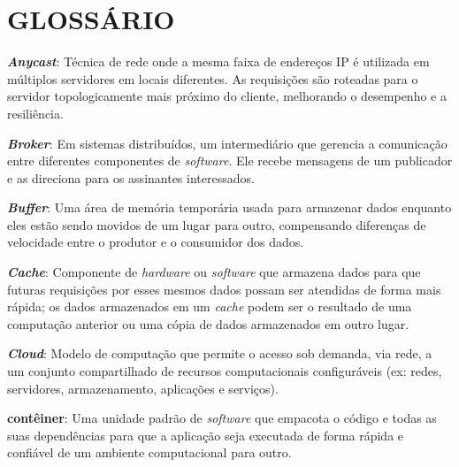 






\chapter*{GLOSSÁRIO}

{ \setlength{\parindent}{0pt} %

\textbf{\textit{Anycast}}: Técnica de rede onde a mesma faixa de endereços IP é utilizada em múltiplos servidores em locais diferentes. As requisições são roteadas para o servidor topologicamente mais próximo do cliente, melhorando o desempenho e a resiliência.

\textbf{\textit{Broker}}: Em sistemas distribuídos, um intermediário que gerencia a comunicação entre diferentes componentes de \textit{software}. Ele recebe mensagens de um publicador e as direciona para os assinantes interessados.

\textbf{\textit{Buffer}}: Uma área de memória temporária usada para armazenar dados enquanto eles estão sendo movidos de um lugar para outro, compensando diferenças de velocidade entre o produtor e o consumidor dos dados.

\textbf{\textit{Cache}}: Componente de \textit{hardware} ou \textit{software} que armazena dados para que futuras requisições por esses mesmos dados possam ser atendidas de forma mais rápida; os dados armazenados em um \textit{cache} podem ser o resultado de uma computação anterior ou uma cópia de dados armazenados em outro lugar.

\textbf{\textit{Cloud}}: Modelo de computação que permite o acesso sob demanda, via rede, a um conjunto compartilhado de recursos computacionais configuráveis (ex: redes, servidores, armazenamento, aplicações e serviços).

\textbf{contêiner}: Uma unidade padrão de \textit{software} que empacota o código e todas as suas dependências para que a aplicação seja executada de forma rápida e confiável de um ambiente computacional para outro.

}
